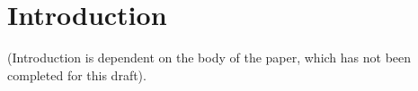 \section{Introduction}
  (Introduction is dependent on the body of the paper, which has not been completed for this draft).

